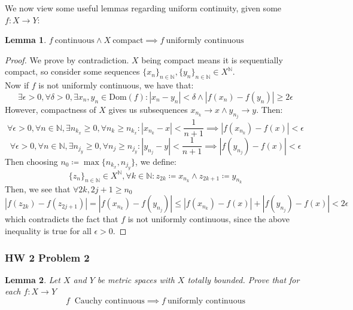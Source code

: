 \documentclass[10pt,letterpaper]{article} %
\newtheorem{lem}{Lemma}[section]
\begin{document}
We now view some useful lemmas regarding uniform continuity, given some $f: X \xrightarrow{} Y$:
\begin{lem}
$f  \ \text{continuous} \land X  \ \text{compact} \implies f \ \text{uniformly continuous}$
\end{lem}
\begin{proof}
We prove by contradiction. $X$ being compact means it is sequentially compact, so consider some sequences $\{x_n\}_{n \in \mathbb{N}}, \{y_n\}_{n \in \mathbb{N}} \in X^\mathbb{N}$.\\

Now if $f$ is not uniformly continuous, we have that:
\begin{equation*}
\exists \epsilon > 0, \forall \delta > 0, \exists x_n, y_n \in \text{Dom}(f): |x_n - y_n| < \delta \land |f(x_n) - f(y_n)| \geqslant 2\epsilon
\end{equation*}
However, compactness of $X$ gives us subsequences $x_{n_k} \xrightarrow{} x \land y_{n_j} \xrightarrow{} y$. Then:
\begin{equation*}
  \forall \epsilon > 0, \forall n \in \mathbb{N}, \exists n_{k_x} \geqslant 0, \forall n_k \geqslant n_{k_x}: |x_{n_k} - x| < \frac{1}{n + 1} \implies |f(x_{n_k}) - f(x)| < \epsilon
\end{equation*}
\begin{equation*}
  \forall \epsilon > 0, \forall n \in \mathbb{N}, \exists n_{j_y} \geqslant 0, \forall n_j \geqslant n_{j_y}: |y_{n_j} - y| < \frac{1}{n+1} \implies |f(y_{n_j}) - f(x)| < \epsilon
\end{equation*}
Then choosing $n_0 \coloneq \max\{n_{k_x}, n_{j_y}\}$, we define:
\begin{equation*}
\{z_n\}_{n \in \mathbb{N}} \in X^\mathbb{N}, \forall k \in \mathbb{N}: z_{2k} \coloneq x_{n_k} \land z_{2k+1} \coloneq y_{n_k}
\end{equation*}
Then, we see that $\forall 2k, 2j+1 \geqslant n_0$
\begin{equation*}
  |f(z_{2k}) - f(z_{2j+1})| = |f(x_{n_k}) - f(y_{n_j})| \leqslant |f(x_{n_k}) - f(x)| + |f(y_{n_j}) - f(x)| < 2\epsilon
\end{equation*}
which contradicts the fact that $f$ is not uniformly continuous, since the above inequality is true for all $\epsilon > 0$. 
\end{proof}


\subsubsection{HW 2 Problem 2}
\begin{lem}
Let $X$ and $Y$ be metric spaces with $X$ totally bounded. Prove that for each $f: X \xrightarrow{} Y$
\begin{equation*}
f \ \text{ Cauchy continuous} \implies f \ \text{uniformly continuous}
\end{equation*}
\end{lem}
\end{document}
